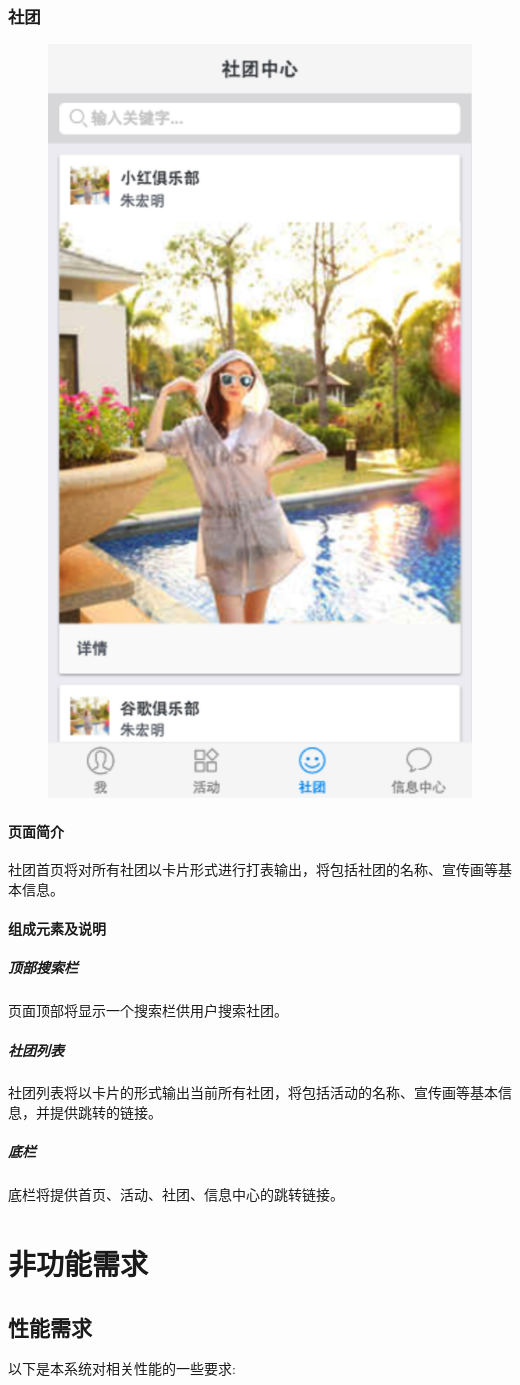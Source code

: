 \documentclass[UTF8]{ctexart}
\begin{document}
\subsubsection{社团}
\begin{figure}[H]
\centering
\includegraphics[width = .5\textwidth]{tong-club-home.png}
\end{figure}
\paragraph{页面简介}
社团首页将对所有社团以卡片形式进行打表输出，将包括社团的名称、宣传画等基本信息。

\paragraph{组成元素及说明}
\subparagraph*{顶部搜索栏}
页面顶部将显示一个搜索栏供用户搜索社团。
\subparagraph*{社团列表}
社团列表将以卡片的形式输出当前所有社团，将包括活动的名称、宣传画等基本信息，并提供跳转的链接。
\subparagraph*{底栏}
底栏将提供首页、活动、社团、信息中心的跳转链接。

\section{非功能需求}
\subsection{性能需求}
以下是本系统对相关性能的一些要求:
\end{document}
